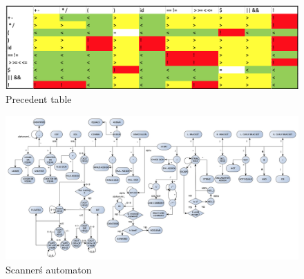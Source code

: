 \documentclass[11pt, titlepage]{article}
\begin{document}
\begin{center}
	\begin{figure}
		\includegraphics[width=\linewidth]{precedent}
		\caption{Precedent table}
		\label{fig:PreTable}
	\end{figure}
\end{center}

\begin{center}
	\begin{landscape}
	\begin{figure}
		\includegraphics[width=\linewidth]{scannerAutomaton}
		\caption{Scanner\'s automaton}
		\label{fig:automaton}
	\end{figure}
	\end{landscape}
\end{center}
\end{document}
